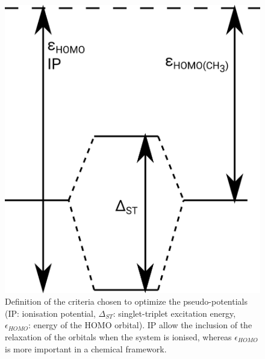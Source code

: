 \documentclass[12pt]{article}
\begin{document}
\begin{figure}
\begin{center}
\includegraphics[width=\columnwidth]{diagram.png}
\end{center}
\vspace{0.25in}
\hspace*{3in}
	\caption{Definition of the criteria chosen to optimize the pseudo-potentials
	(IP: ionisation potential, $\Delta_{ST}$: singlet-triplet excitation energy, $\epsilon_{HOMO}$: energy of the HOMO orbital).
	IP allow the inclusion of the relaxation of the orbitals when the system is ionised, whereas $\epsilon_{HOMO}$ is more important
	in a chemical framework.}
\label{figure:diagram}
\end{figure}
\end{document}
